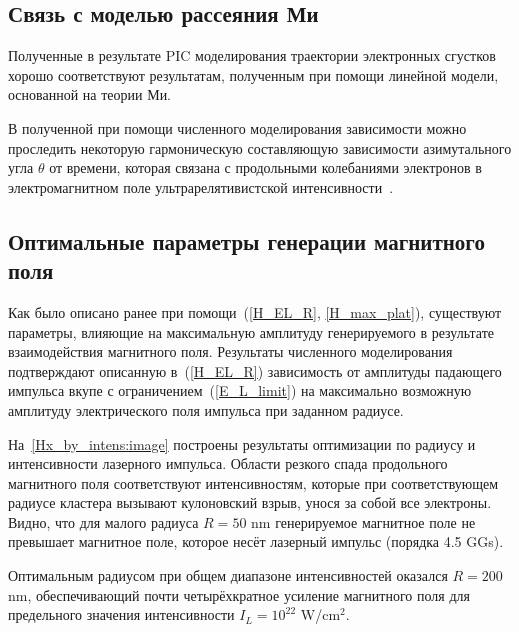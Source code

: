 \subsection{Связь с моделью рассеяния Ми}

Полученные в результате PIC моделирования траектории электронных сгустков хорошо соответствуют результатам, полученным при помощи линейной модели, основанной на теории Ми.


В полученной при помощи численного моделирования зависимости можно проследить некоторую гармоническую составляющую зависимости азимутального угла $\theta$ от времени, которая связана с продольными колебаниями электронов в электромагнитном поле ультрарелятивистской интенсивности~\cite{landau_field_theory}.

\subsection{Оптимальные параметры генерации магнитного поля}

Как было описано ранее при помощи~(\ref{H_EL_R}, \ref{H_max_plat}), существуют параметры, влияющие на максимальную амплитуду генерируемого в результате взаимодействия магнитного поля. Результаты численного моделирования подтверждают описанную в~(\ref{H_EL_R}) зависимость от амплитуды падающего импульса вкупе с ограничением~(\ref{E_L_limit}) на максимально возможную амплитуду электрического поля импульса при заданном радиусе.

На~\autoref{Hx_by_intens:image} построены результаты оптимизации по радиусу и интенсивности лазерного импульса. Области резкого спада продольного магнитного поля соответствуют интенсивностям, которые при соответствующем радиусе кластера вызывают кулоновский взрыв, унося за собой все электроны. Видно, что для малого радиуса $R = 50$ nm генерируемое магнитное поле не превышает магнитное поле, которое несёт лазерный импульс (порядка 4.5 GGs).

Оптимальным радиусом при общем диапазоне интенсивностей оказался $R = 200$ nm, обеспечивающий почти четырёхкратное усиление магнитного поля для предельного значения интенсивности $I_L = 10^{22}$ W/cm$^{2}$.

